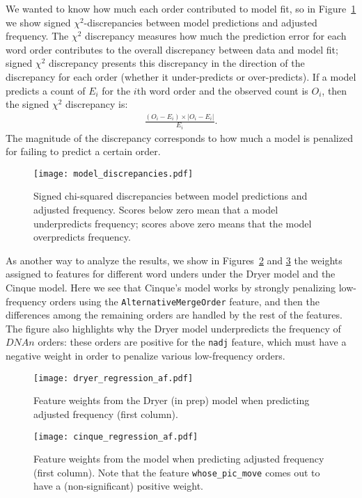\documentclass[11pt]{article}
\newcommand{\alternativeMergeOrder}{\texttt{AlternativeMergeOrder}\xspace}
\begin{document}
We wanted to know how much each order contributed to model fit, so in Figure~\ref{fig:af-discrepancies} we show signed $\chi^2$-discrepancies between model predictions and adjusted frequency. The $\chi^2$ discrepancy measures how much the prediction error for each word order contributes to the overall discrepancy between data and model fit; signed $\chi^2$ discrepancy presents this discrepancy in the direction of the discrepancy for each order (whether it under-predicts or over-predicts).
If a model predicts a count of $E_i$ for the $i$th word order and the observed count is $O_i$, then the signed $\chi^2$ discrepancy is:
\begin{align}
  \nonumber
  \frac{(O_i - E_i) \times |O_i - E_i|}
       {E_i}.
\end{align}
The magnitude of the discrepancy corresponds to how much a model is penalized for failing to predict a certain order.

\begin{figure}[ht!]
  \centering
  \texttt{[image: model\_discrepancies.pdf]}
  \caption{Signed chi-squared discrepancies between model predictions and adjusted frequency. Scores below zero mean that a model underpredicts frequency; scores above zero means that the model overpredicts frequency.}
  \label{fig:af-discrepancies}
\end{figure}

As another way to analyze the results, we show in Figures~\ref{fig:dryer-model} and \ref{fig:cinque-model} the weights assigned to features for different word unders under the Dryer model and the Cinque model.
Here we see that Cinque's model works by strongly penalizing low-frequency orders using the \alternativeMergeOrder feature, and then the differences among the remaining orders are handled by the rest of the features.
The figure also highlights why the Dryer model underpredicts the frequency of $DNAn$ orders: these orders are positive for the \texttt{nadj} feature, which must have a negative weight in order to penalize various low-frequency orders.

\begin{figure}[ht!]
  \centering
  \texttt{[image: dryer\_regression\_af.pdf]}
  \caption{Feature weights from the Dryer (in prep) model when predicting adjusted frequency (first column).}
  \label{fig:dryer-model}
\end{figure}

\begin{figure}[ht!]
  \centering
  \texttt{[image: cinque\_regression\_af.pdf]}
  \cprotect\caption{Feature weights from the \citet{cinque2005deriving} model when predicting adjusted frequency (first column). Note that the feature \verb+whose_pic_move+ comes out to have a (non-significant) positive weight.}
  \label{fig:cinque-model}
\end{figure}
\end{document}
